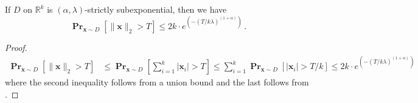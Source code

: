 \documentclass{theoretics}
\newcommand\twonorm[1]{\|#1\|_2}
\renewcommand\vec[1]{\mathbf{#1}}
\DeclareMathOperator*{\pr}{\mathbf{Pr}}
\newcommand{\R}{\mathbb{R}}
\newcommand{\1}{\Ind}
\newcommand{\x}{\vec x}
\begin{document}
\begin{lemma}
    \label{lem:norm_tail}
    If $D$ on $\R^k$ is $(\alpha,\lambda)$-strictly subexponential, then we have
    \[
    \pr_{\x\sim D}\left[\twonorm{\x}>T\right]\leq 2k\cdot e^{\left(-(T/k\lambda)^{(1+\alpha)}\right) }  \,.
    \]
\end{lemma}
 \begin{proof}
\begin{align*}
    \pr_{\x\sim D}\left[\twonorm{\x}>T\right]&\leq \pr_{\x\sim D}\left[\sum_{i=1}^{k}|\x_i|>T\right]
    \leq \sum_{i=1}^{k}\pr_{\x\sim D}\left[|\x_i|>T/k\right]
    \leq 2k\cdot e^{\left(-(T/k\lambda)^{(1+\alpha)}\right)}\,
\end{align*} where the second inequality follows from a union bound and the last follows from .
\end{proof}
\end{document}
